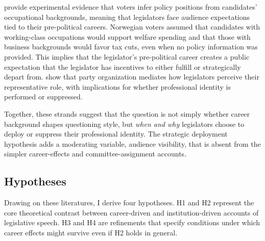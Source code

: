 \documentclass[11pt]{article}
\begin{document}
\citet{arnesen2018} provide experimental evidence that voters infer policy positions from candidates' occupational backgrounds, meaning that legislators face audience expectations tied to their pre-political careers. Norwegian voters assumed that candidates with working-class occupations would support welfare spending and that those with business backgrounds would favor tax cuts, even when no policy information was provided. This implies that the legislator's pre-political career creates a public expectation that the legislator has incentives to either fulfill or strategically depart from. \citet{close2024} show that party organization mediates how legislators perceive their representative role, with implications for whether professional identity is performed or suppressed.

Together, these strands suggest that the question is not simply whether career background shapes questioning style, but \textit{when and why} legislators choose to deploy or suppress their professional identity. The strategic deployment hypothesis adds a moderating variable, audience visibility, that is absent from the simpler career-effects and committee-assignment accounts.

\subsection{Hypotheses}

Drawing on these literatures, I derive four hypotheses. H1 and H2 represent the core theoretical contrast between career-driven and institution-driven accounts of legislative speech. H3 and H4 are refinements that specify conditions under which career effects might survive even if H2 holds in general.
\end{document}
